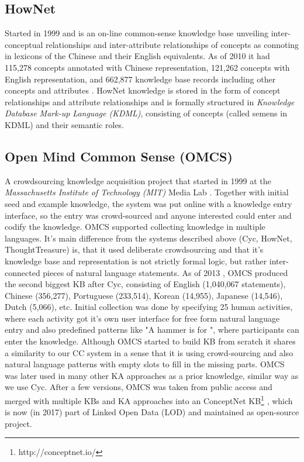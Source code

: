 \subsection{HowNet}
\label{section:r:hownet}
Started in 1999 and is an on-line common-sense knowledge base 
unveiling inter-conceptual relationships and inter-attribute relationships of 
concepts as connoting in lexicons of the Chinese and their English equivalents. 
As of 2010 it had 115,278 concepts annotated with Chinese representation, 
121,262 concepts with English representation, and 662,877 knowledge base records
including other concepts and attributes \parencite{Dong2010}. HowNet knowledge 
is stored in the form of concept relationships and attribute relationships and 
is formally structured in \emph{Knowledge Database Mark-up Language (KDML)}, consisting
of concepts (called semens in KDML) and their semantic roles.
 
\subsection{Open Mind Common Sense (OMCS)}
\label{section:r:omcs}
A crowdsourcing knowledge acquisition 
project that started in 1999 at the \emph{Massachusetts Institute of Technology (MIT)} Media Lab \parencite{Singh2002a}. 
Together with initial seed and example knowledge, the system was put online with
a knowledge entry interface, so the entry was crowd-sourced and anyone 
interested could enter and codify the knowledge. OMCS supported collecting 
knowledge in multiple languages. It's main difference from the systems described
above (Cyc, HowNet, ThoughtTreasure) is, that it used deliberate crowdsourcing
and that it's knowledge base and representation is not strictly formal logic, 
but rather inter-connected pieces of natural language statements. As of 2013 
\parencite{Zang2013}, OMCS produced the second biggest KB after Cyc, consisting of 
English (1,040,067 statements), Chinese (356,277), Portuguese (233,514), 
Korean (14,955), Japanese (14,546), Dutch (5,066), etc. Initial collection was
done by specifying 25 human activities, where each activity got it's own user 
interface for free form natural language entry and also predefined patterns 
like "A hammer is for \underline{\hspace{1.0cm}}", where participants can enter
the knowledge. Although OMCS started to build KB from scratch it shares a 
similarity to our CC system in a sense that it is using crowd-sourcing and also
natural language patterns with empty slots to fill in the missing parts. OMCS was
later used in many other KA approaches as a prior knowledge, similar way as we 
use Cyc. After a few versions, OMCS was taken from public access and merged with
multiple KBs and KA approaches into an ConceptNet 
KB\footnote{http://conceptnet.io/} \parencite{Speer2016}, which is now (in 2017)
part of Linked Open Data (LOD) and maintained as open-source project.

